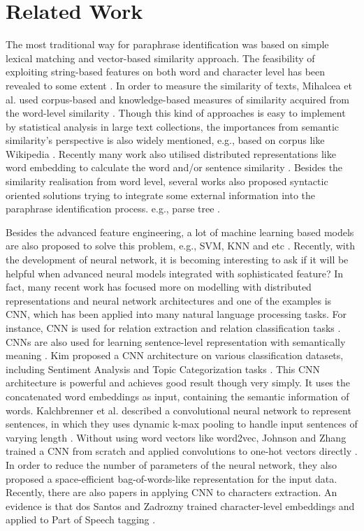 \documentclass[conference]{IEEEtran}
\begin{document}
\section{Related Work}
The most traditional way for paraphrase identification was based on simple lexical matching and vector-based similarity approach. The feasibility of exploiting string-based features on both word and character level has been revealed to some extent \cite{selfdef:conf/altw/WanDDP06}. In order to measure the similarity of texts, Mihalcea et al. used corpus-based and knowledge-based measures of similarity acquired from the word-level similarity \cite{DBLP:conf/aaai/MihalceaCS06}. Though this kind of approaches is easy to implement by statistical analysis in large text collections, the importances from semantic similarity's perspective is also widely mentioned, e.g., based on corpus like Wikipedia \cite{DBLP:conf/ijcai/GabrilovichM07}. Recently many work also utilised distributed representations like word embedding to calculate the word and/or sentence similarity \cite{DBLP:conf/icml/SantosZ14}. Besides the similarity realisation from word level, several works also proposed syntactic oriented solutions trying to integrate some external information into the paraphrase identification process. e.g., parse tree \cite{DBLP:conf/acl/DasS09}.

Besides the advanced feature engineering, a lot of machine learning based models are also proposed to solve this problem, e.g., SVM, KNN and etc \cite{DBLP:conf/fintal/KozarevaM06}. Recently, with the development of neural network, it is becoming interesting to ask if it will be helpful when advanced neural models integrated with sophisticated feature? In fact, many recent work has focused more on modelling with distributed representations and neural network architectures and one of the examples is CNN, which has been applied into many natural language processing tasks. For instance, CNN is used for relation extraction and relation classification tasks \cite{nguyen2015relation}. CNNs are also used for learning sentence-level representation with semantically meaning \cite{DBLP:conf/cikm/ShenHGDM14}. Kim proposed a CNN architecture on various classification datasets, including Sentiment Analysis and Topic Categorization tasks \cite{DBLP:conf/emnlp/Kim14}. This CNN architecture is powerful and achieves good result though very simply. It uses the concatenated word embeddings as input, containing the semantic information of words. Kalchbrenner et al. described a convolutional neural network to represent sentences, in which they uses dynamic k-max pooling to handle input sentences of varying length \cite{DBLP:conf/acl/KalchbrennerGB14}. Without using word vectors like word2vec, Johnson and Zhang trained a CNN from scratch and applied convolutions to one-hot vectors directly \cite{DBLP:conf/nips/JohnsonZ15}. In order to reduce the number of parameters of the neural network, they also proposed a space-efficient bag-of-words-like representation for the input data. Recently, there are also papers in applying CNN to characters extraction. An evidence is that dos Santos and Zadrozny trained character-level embeddings and applied to Part of Speech tagging \cite{DBLP:conf/icml/SantosZ14}.
\end{document}
